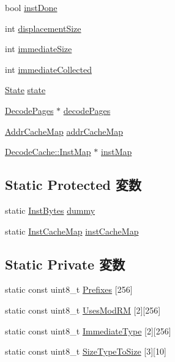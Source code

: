 \begin{DoxyCompactItemize}
\item 
bool \hyperlink{classX86ISA_1_1Decoder_a37c5d55785204b8fd00a8ebf62e1fc33}{instDone}
\item 
int \hyperlink{classX86ISA_1_1Decoder_a494ae21b1676198853f989b5003e0c06}{displacementSize}
\item 
int \hyperlink{classX86ISA_1_1Decoder_a61f77f04393db6b7fe844adc3f78b644}{immediateSize}
\item 
int \hyperlink{classX86ISA_1_1Decoder_a9923210a91a1b233397e87d09325cfac}{immediateCollected}
\item 
\hyperlink{classX86ISA_1_1Decoder_a5d74787dedbc4e11c1ab15bf487e61f8}{State} \hyperlink{classX86ISA_1_1Decoder_a876b486d3a5241a126bd5751c5f70f79}{state}
\item 
\hyperlink{classDecodeCache_1_1AddrMap}{DecodePages} $\ast$ \hyperlink{classX86ISA_1_1Decoder_a259ba942ab7ed4dcb7661396959966be}{decodePages}
\item 
\hyperlink{classX86ISA_1_1Decoder_a17e66c491b538e223da13acf9d77d5f2}{AddrCacheMap} \hyperlink{classX86ISA_1_1Decoder_aa5687d2256dc3674692589549cd833da}{addrCacheMap}
\item 
\hyperlink{namespaceDecodeCache_ac4aa7140c72815d25936c8dcf04191f1}{DecodeCache::InstMap} $\ast$ \hyperlink{classX86ISA_1_1Decoder_a4c63c65e342dd96985ba874deb29db03}{instMap}
\end{DoxyCompactItemize}
\subsection*{Static Protected 変数}
\begin{DoxyCompactItemize}
\item 
static \hyperlink{structX86ISA_1_1Decoder_1_1InstBytes}{InstBytes} \hyperlink{classX86ISA_1_1Decoder_ab36b2d3338c466d225603823b5e4f9a4}{dummy}
\item 
static \hyperlink{classX86ISA_1_1Decoder_accbfac5b46e737fd6326272fba1a8bb2}{InstCacheMap} \hyperlink{classX86ISA_1_1Decoder_a2f55fd436a83562102f84954df9f5ed0}{instCacheMap}
\end{DoxyCompactItemize}
\subsection*{Static Private 変数}
\begin{DoxyCompactItemize}
\item 
static const uint8\_\-t \hyperlink{classX86ISA_1_1Decoder_a4790fc37f276d111825695679818d082}{Prefixes} \mbox{[}256\mbox{]}
\item 
static const uint8\_\-t \hyperlink{classX86ISA_1_1Decoder_a6e9f1359a8e815c5bdd0efc306f5bf32}{UsesModRM} \mbox{[}2\mbox{]}\mbox{[}256\mbox{]}
\item 
static const uint8\_\-t \hyperlink{classX86ISA_1_1Decoder_a3f9cce9eaf915705c0fd4d90d9bcf8f8}{ImmediateType} \mbox{[}2\mbox{]}\mbox{[}256\mbox{]}
\item 
static const uint8\_\-t \hyperlink{classX86ISA_1_1Decoder_a30eeeb2cd279f8cfcbafbd9873691d2f}{SizeTypeToSize} \mbox{[}3\mbox{]}\mbox{[}10\mbox{]}
\end{DoxyCompactItemize}



